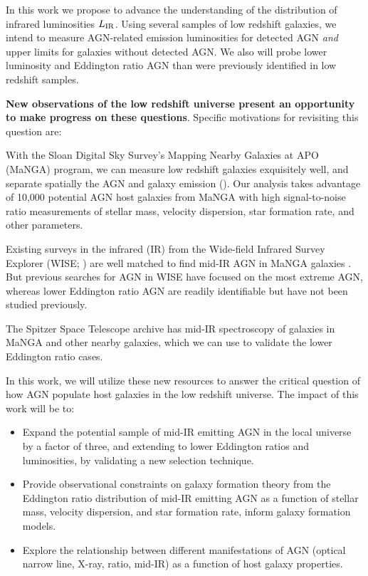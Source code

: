 \documentclass[12pt, preprint]{hacked-aastex}
\newlength{\mylen}
\newenvironment{ditemize}
{ \begin{list}{}{%
\setlength{\topsep}{0pt}%
\setlength{\partopsep}{3pt}%
\setlength{\itemsep}{1pt}\setlength{\parsep}{1pt}%
\setlength{\itemindent}{0pt}\setlength{\listparindent}{12pt}%
\setlength{\leftmargin}{24pt}\setlength{\rightmargin}{0in}%
\setlength{\labelsep}{3pt}\setlength{\labelwidth}{6pt}%
\setlength{\mylen}{3pt}
\renewcommand{\makelabel}{\makebox[\labelwidth][l]{\raisebox{\mylen}{\tiny$\bullet$}\hspace{\fill}}}}}
{\end{list}}
\begin{document}
In this work we propose to advance the understanding of the 
distribution of infrared luminosities $L_{\rm IR}$. Using 
several samples of low redshift galaxies, we intend to measure
AGN-related emission luminosities for detected AGN {\it and} 
upper limits for galaxies without detected AGN. We also will
probe lower luminosity and Eddington ratio AGN than were previously
identified in low redshift samples.

{\bf New observations of the low redshift universe present an 
opportunity to make progress on these questions}. Specific
motivations for revisiting this question are:
\begin{ditemize}
\item
With the Sloan Digital 
Sky Survey's Mapping Nearby Galaxies at APO (MaNGA) program, we can measure low
redshift galaxies exquisitely well, and separate spatially the AGN and 
galaxy emission (\cite{bundy15a, blanton17a}). 
Our analysis takes advantage of 10,000 potential AGN host galaxies from
MaNGA with  high signal-to-noise ratio measurements of stellar mass, velocity
dispersion, star formation rate, and other parameters.
\item Existing surveys in the infrared (IR) from the Wide-field Infrared Survey Explorer 
(WISE; \cite{wright10a}) are well matched to find mid-IR AGN in MaNGA galaxies 
\cite{comerford20a}. But previous searches for AGN in WISE have focused on
the most extreme AGN, whereas lower Eddington ratio AGN are readily identifiable
but have not been studied previously.
\item The Spitzer Space Telescope archive has mid-IR spectroscopy of galaxies in MaNGA
and other nearby galaxies, which we can use to validate the lower Eddington ratio 
cases. 
\end{ditemize}

In this work, we will utilize these new resources to answer the 
critical question of how AGN populate host galaxies in the low redshift
universe. The impact of this work will be to:
\begin{itemize}
    \item Expand the potential sample of mid-IR emitting AGN in the local universe 
     by a factor of three, and extending to lower Eddington ratios and
     luminosities, by validating a new selection technique. 
    \item Provide observational constraints on galaxy formation theory from 
     the Eddington ratio  distribution  of mid-IR emitting  AGN as a function of
     stellar mass,  velocity dispersion, and star formation rate, inform galaxy
     formation models.
    \item Explore the relationship between different manifestations of AGN
    (optical narrow line, X-ray, ratio, mid-IR) as a function of host galaxy 
    properties. 
\end{itemize}
\end{document}
